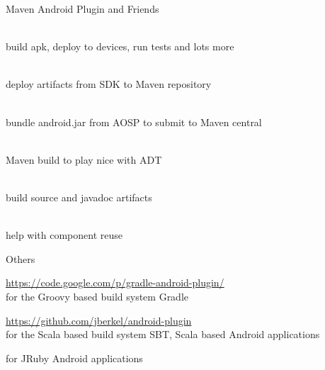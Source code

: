 \documentclass[aspectratio=169]{beamer}
\newcommand{\surl}[1] {{\tiny \url{#1}}}
\begin{document}
    \begin{frame}{Maven Android Plugin and Friends}
      \begin{description}
       \item<1->[Maven Android Plugin \surl{http://code.google.com/p/maven-android-plugin/}] \hfill \\ build apk, deploy to devices, run tests and lots more
       \item<2->[Maven Android SDK Deployer \surl{https://github.com/mosabua/maven-android-sdk-deployer}] \hfill \\ deploy artifacts from SDK to Maven repository
       \item<3->[Android4Maven \surl{http://sourceforge.net/projects/android4maven/}] \hfill \\ bundle android.jar from AOSP to submit to Maven central
       \item<4->[M2E Android \surl{https://github.com/rgladwell/m2e-android}] \hfill \\ Maven build to play nice with ADT
       \item<5->[AndroidSDKFido \surl{https://github.com/joakime/android-sdkfido}] \hfill \\  build source and javadoc artifacts
       \item<6->[Android RIndirect \surl{https://github.com/akquinet/android-rindirect}] \hfill \\  help with component reuse
      \end{description}
    \end{frame}

    \begin{frame}{Others}
      \begin{description}
        \item<1->[Gradle Android Plugin] \surl{https://code.google.com/p/gradle-android-plugin/} \hfill \\ for the Groovy based build system Gradle
        \item<2->[SBT Android Plugin] \surl{https://github.com/jberkel/android-plugin} \hfill \\ for the Scala based build system SBT, Scala based Android applications
        \item<3->[Rake/Ruboto] for JRuby Android applications 
      \end{description}
    \end{frame}
\end{document}
